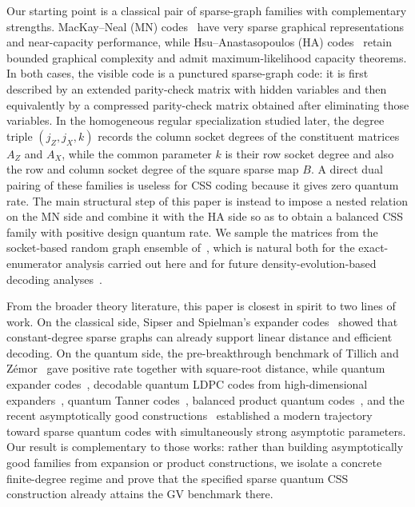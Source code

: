 \documentclass[11pt]{article}
\theoremstyle{definition}
\begin{document}
Our starting point is a classical pair of sparse-graph families with complementary strengths. MacKay--Neal (MN) codes~\cite{MN96} have very sparse graphical representations and near-capacity performance, while Hsu--Anastasopoulos (HA) codes~\cite{HA05} retain bounded graphical complexity and admit maximum-likelihood capacity theorems. In both cases, the visible code is a punctured sparse-graph code: it is first described by an extended parity-check matrix with hidden variables and then equivalently by a compressed parity-check matrix obtained after eliminating those variables. In the homogeneous regular specialization studied later, the degree triple \((j_Z,j_X,k)\) records the column socket degrees of the constituent matrices \(A_Z\) and \(A_X\), while the common parameter \(k\) is their row socket degree and also the row and column socket degree of the square sparse map \(B\). A direct dual pairing of these families is useless for CSS coding because it gives zero quantum rate. The main structural step of this paper is instead to impose a nested relation on the MN side and combine it with the HA side so as to obtain a balanced CSS family with positive design quantum rate. We sample the matrices from the socket-based random graph ensemble of~\cite[Secs.~3.3--3.4]{RU08}, which is natural both for the exact-enumerator analysis carried out here and for future density-evolution-based decoding analyses~\cite[Sec.~3.9 and App.~B]{RU08}.

From the broader theory literature, this paper is closest in spirit to two lines of work. On the classical side, Sipser and Spielman's expander codes~\cite{SipserS94} showed that constant-degree sparse graphs can already support linear distance and efficient decoding. On the quantum side, the pre-breakthrough benchmark of Tillich and Z{\'e}mor~\cite{TZ09} gave positive rate together with square-root distance, while quantum expander codes~\cite{LeverrierTZ15}, decodable quantum LDPC codes from high-dimensional expanders~\cite{EvraKZ20}, quantum Tanner codes~\cite{LZ22}, balanced product quantum codes~\cite{BreuckmannE21}, and the recent asymptotically good constructions~\cite{PK21,DHLV22} established a modern trajectory toward sparse quantum codes with simultaneously strong asymptotic parameters. Our result is complementary to those works: rather than building asymptotically good families from expansion or product constructions, we isolate a concrete finite-degree regime and prove that the specified sparse quantum CSS construction already attains the GV benchmark there.
\end{document}

